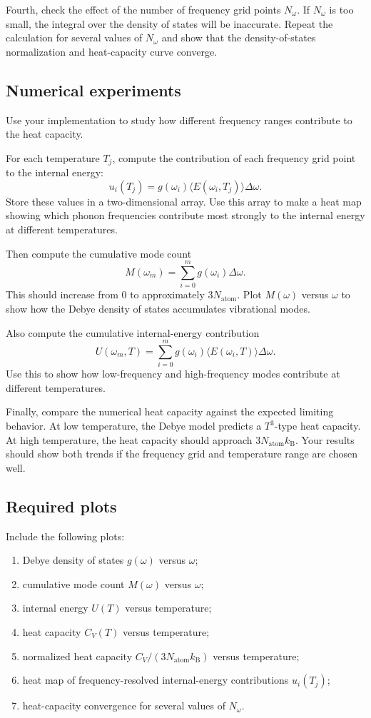 Fourth, check the effect of the number of frequency grid points \(N_\omega\). If \(N_\omega\) is too small, the integral over the density of states will be inaccurate. Repeat the calculation for several values of \(N_\omega\) and show that the density-of-states normalization and heat-capacity curve converge.

\subsection{Numerical experiments}

Use your implementation to study how different frequency ranges contribute to the heat capacity.

For each temperature \(T_j\), compute the contribution of each frequency grid point to the internal energy:
\[
u_i(T_j)=g(\omega_i)\langle E(\omega_i,T_j)\rangle\Delta\omega.
\]
Store these values in a two-dimensional array. Use this array to make a heat map showing which phonon frequencies contribute most strongly to the internal energy at different temperatures.

Then compute the cumulative mode count
\[
M(\omega_m)=\sum_{i=0}^{m}g(\omega_i)\Delta\omega.
\]
This should increase from \(0\) to approximately \(3N_{\mathrm{atom}}\). Plot \(M(\omega)\) versus \(\omega\) to show how the Debye density of states accumulates vibrational modes.

Also compute the cumulative internal-energy contribution
\[
U(\omega_m,T)=\sum_{i=0}^{m}g(\omega_i)\langle E(\omega_i,T)\rangle\Delta\omega.
\]
Use this to show how low-frequency and high-frequency modes contribute at different temperatures.

Finally, compare the numerical heat capacity against the expected limiting behavior. At low temperature, the Debye model predicts a \(T^3\)-type heat capacity. At high temperature, the heat capacity should approach \(3N_{\mathrm{atom}}k_{\mathrm B}\). Your results should show both trends if the frequency grid and temperature range are chosen well.

\subsection{Required plots}

Include the following plots:

\begin{enumerate}
    \item Debye density of states \(g(\omega)\) versus \(\omega\);
    \item cumulative mode count \(M(\omega)\) versus \(\omega\);
    \item internal energy \(U(T)\) versus temperature;
    \item heat capacity \(C_V(T)\) versus temperature;
    \item normalized heat capacity \(C_V/(3N_{\mathrm{atom}}k_{\mathrm B})\) versus temperature;
    \item heat map of frequency-resolved internal-energy contributions \(u_i(T_j)\);
    \item heat-capacity convergence for several values of \(N_\omega\).
\end{enumerate}

